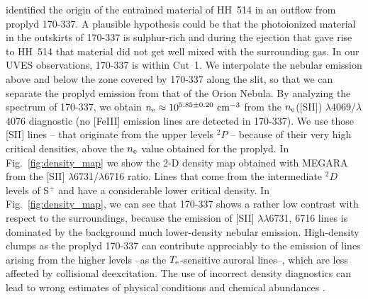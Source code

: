 \documentclass[fleqn,usenatbib]{mnras}
\begin{document}
\citet{bally00} identified the origin of the entrained material of HH~514 in an outflow from proplyd 170-337. A plausible hypothesis could be that the photoionized material in the outskirts of 170-337 is sulphur-rich and during the ejection that gave rise to HH~514 that material did not get well mixed with the surrounding gas. In our UVES observations, 170-337 is within Cut~1. We interpolate the nebular emission above and below the zone covered by 170-337 along the slit, so that we can separate the proplyd emission from that of the Orion Nebula. By analyzing the spectrum of 170-337, we obtain  $n_{\rm e}\approx 10^{5.85 \pm 0.20} \text{ cm}^{-3}$ from the $n_{\rm e}$([S\thinspace II]) $\lambda$4069/$\lambda$4076 diagnostic (no [Fe\thinspace III] emission lines are detected in 170-337). We use those [S\thinspace II] lines -- that originate from the upper levels $^2P$ -- because of their very high critical densities, above the $n_{\rm e}$ value obtained for the proplyd. In Fig.~\ref{fig:density_map} we show the 2-D density map obtained with MEGARA from the [S\thinspace II] $\lambda$6731/$\lambda$6716 ratio. Lines that come from the intermediate $^2D$ levels of S$^{+}$ and have a considerable lower critical density. In Fig.~\ref{fig:density_map}, we can see that 170-337 shows a rather low contrast with respect to the surroundings, because the emission of [S\thinspace II] $\lambda\lambda$6731, 6716 lines is dominated by the background much lower-density nebular emission. High-density clumps as the proplyd 170-337 can contribute appreciably to the emission of lines arising from the higher levels --as the $T_{\rm e}$-sensitive auroral lines--, which are less affected by collisional deexcitation. The use of incorrect density diagnostics can lead to wrong estimates of physical conditions and chemical abundances \citep[][]{mendez2021-2}. 
\end{document}
